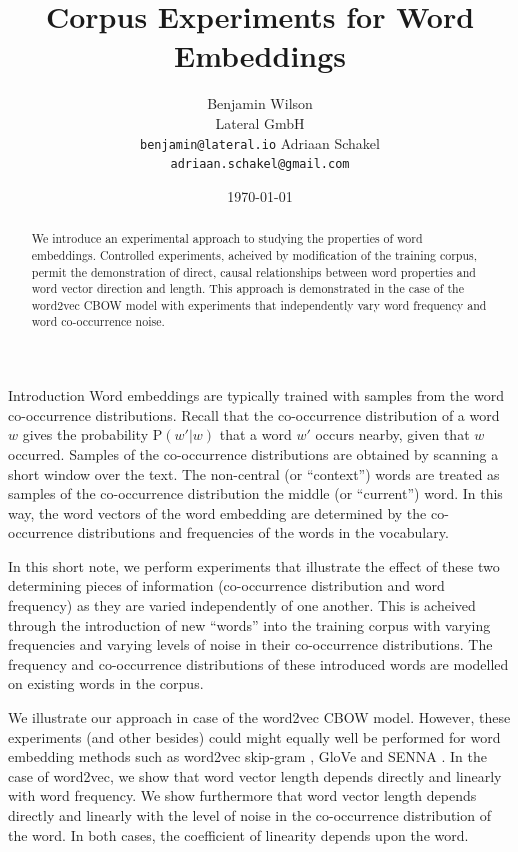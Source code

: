 \documentclass{article} %
\title{Corpus Experiments for Word Embeddings}
\author{
 	Benjamin Wilson\\
	Lateral GmbH\\
	\texttt{benjamin@lateral.io}
	\And
	Adriaan Schakel\\
	\texttt{adriaan.schakel@gmail.com}
 }
\date{\today}
\newcommand{\p}{\text{P}}
\begin{document}
\graphicspath{{../outputs/}}
\maketitle


\begin{abstract}
	We introduce an experimental approach to studying the properties of word embeddings.
	Controlled experiments, acheived by modification of the training corpus, permit the demonstration of direct, causal relationships between word properties and word vector direction and length.
	This approach is demonstrated in the case of the word2vec CBOW model with experiments that independently vary word frequency and word co-occurrence noise.
\end{abstract} 

\begin{section}{Introduction}
Word embeddings are typically trained with samples from the word co-occurrence distributions.
Recall that the co-occurrence distribution of a word $w$ gives the probability $\p(w'|w)$ that a word $w'$ occurs nearby, given that $w$ occurred.
Samples of the co-occurrence distributions are obtained by scanning a short window over the text.
The non-central (or ``context'') words are treated as samples of the co-occurrence distribution the middle (or ``current'') word. 
In this way, the word vectors of the word embedding are determined by the co-occurrence distributions and frequencies of the words in the vocabulary.

In this short note, we perform experiments that illustrate the effect of these two determining pieces of information (co-occurrence distribution and word frequency) as they are varied independently of one another.
This is acheived through the introduction of new ``words'' into the training corpus with varying frequencies and varying levels of noise in their co-occurrence distributions.
The frequency and co-occurrence distributions of these introduced words are modelled on existing words in the corpus.

We illustrate our approach in case of the word2vec CBOW model.
However, these experiments (and other besides) could might equally well be performed for word embedding methods such as word2vec skip-gram \cite{DistRepns,EfficientEstimation}, GloVe \cite{pennington2014glove} and SENNA \cite{collobert-2011}.
In the case of word2vec, we show that word vector length depends directly and linearly with word frequency.
We show furthermore that word vector length depends directly and linearly with the level of noise in the co-occurrence distribution of the word.
In both cases, the coefficient of linearity depends upon the word.


\end{section}
\end{document}
